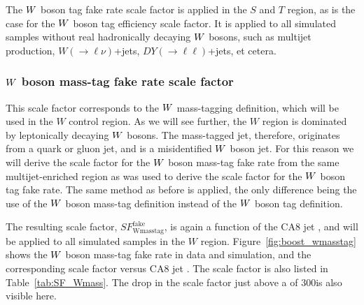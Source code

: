The $W$ boson tag fake rate scale factor is applied in the $S$ and $T$ region, as is the case for
the $W$ boson tag efficiency scale factor. It is applied to all simulated samples without real
hadronically decaying $W$ bosons, such as multijet production, $W(\rightarrow\ell\nu)$+jets,
$DY(\rightarrow\ell\ell)$+jets, et cetera. 


\subsubsection{\texorpdfstring{$W$}{W} boson mass-tag fake rate scale factor
\label{sec:wmasstag_fake_sf}}

This scale factor corresponds to the $W$ mass-tagging definition, which will be used in the $W$
control region. As we will see further, the $W$ region is dominated by leptonically decaying $W$
bosons. The mass-tagged jet, therefore, originates from a quark or gluon jet, and is a
misidentified $W$ boson jet. For this reason we will derive the scale factor for the $W$ boson
mass-tag fake rate from the same multijet-enriched region as was used to derive the scale factor for
the $W$ boson tag fake rate. The same method as before is applied, the only difference being
the use of the $W$ boson mass-tag definition instead of the $W$ boson tag definition. 

The resulting scale factor, $SF_\textrm{Wmasstag}^\textrm{fake}$, is again a function of the CA8
jet \pt, and will be applied to all simulated samples in the $W$ region.
Figure~\ref{fig:boost_wmasstag} shows the $W$ boson mass-tag fake rate in data and
simulation, and the corresponding scale factor versus CA8 jet \pt. The scale factor is also
listed in Table~\ref{tab:SF_Wmass}. 
The drop in the scale factor just above a \pt of 300\GeV is also visible here. 

